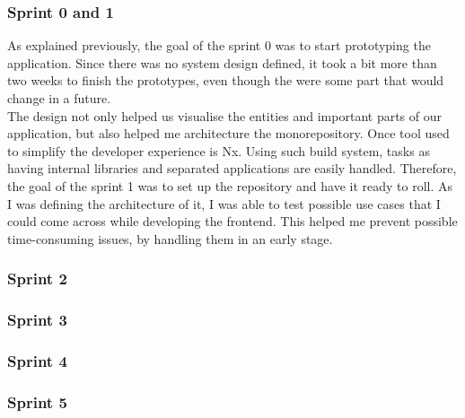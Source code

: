 \documentclass[../memory.tex]{subfiles}
\begin{document}
\subsubsection{Sprint 0 and 1}
As explained previously, the goal of the sprint 0 was to start prototyping the
application. Since there was no system design defined, it took a bit more than
two weeks to finish the prototypes, even though the were some part that would
change in a future.
\\
The design not only helped us visualise the entities and important parts of our
application, but also helped me architecture the monorepository. Once tool used
to simplify the developer experience is Nx. Using such build system, tasks as
having internal libraries and separated applications are easily handled.
Therefore, the goal of the sprint 1 was to set up the repository and have it
ready to roll. As I was defining the architecture of it, I was able to test
possible use cases that I could come across while developing the frontend. This
helped me prevent possible time-consuming issues, by handling them in an early
stage.
\subsubsection{Sprint 2}
\subsubsection{Sprint 3}
\subsubsection{Sprint 4}
\subsubsection{Sprint 5}
\end{document}
